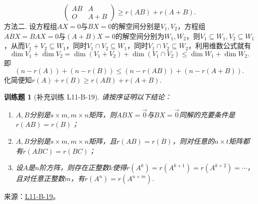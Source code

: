 \documentclass[12pt,fontset=fandol]{ctexart}
\newtheorem{exercise}{训练题}[section]
\begin{document}
\begin{solve}
\[\begin{pmatrix}
                  AB & A   \\
                  O  & A+B
              \end{pmatrix}\geqslant
              r(AB)+r(A+B). \]
          方法二. 设方程组$AX=0$与$BX=0$的解空间分别是$V_1, V_2$，方程组$ABX=BAX=0$与$(A+B)X=0$的解空间分别为$W_1, W_2$，则$V_1\subseteq W_1, V_2\subseteq W_1$，从而$V_1+V_2\subseteq W_1$，同时$V_1\cap V_2\subseteq W_1$，同时$V_1\cap V_2\subseteq W_2$，利用维数公式就有
          \[ \dim V_1+\dim V_2=\dim(V_1+V_2)+\dim(V_1\cap V_2)\leqslant \dim W_1+\dim W_2. \]
          即
          \[ (n-r(A))+(n-r(B))\leqslant (n-r(AB))+(n-r(A+B)). \]
          化简便知$r(A)+r(B)\geqslant r(AB)+r(A+B)$.
\end{solve}

\begin{exercise}[补充训练 L11-B-19]\label{prob:L11-B-19}
请按序证明以下结论：
        \begin{enumerate}
            \item $A,B$分别是$s \times m,m \times n$矩阵，则$ABX=\vec{0}$与$BX=\vec{0}$同解的充要条件是$r(AB)=r(B)$；

            \item $A,B$分别是$s \times m,m \times n$矩阵，且$r(AB)=r(B)$，则对任意的$n \times t$矩阵都有$r(ABC)=r(BC)$；

            \item 设$A$是$n$阶方阵，则存在正整数$k$使得$r(A^k)=r(A^{k+1})=r(A^{k+2})=\cdots$，且对任意正整数$m$，有$r(A^n)=r(A^{n+m})$.
        \end{enumerate}
\end{exercise}
\noindent 来源：\href{https://github.com/yhwu-is/Linear-Algebra-Left-Undone/blob/new/%E8%AE%B2%E4%B9%89/%E4%B8%93%E9%A2%98/11%20%E6%9C%9D%E8%8A%B1%E5%A4%95%E6%8B%BE.tex}{L11-B-19}。
\end{document}
